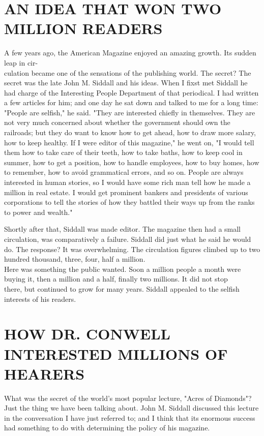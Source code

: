\documentclass[10pt]{article}
\begin{document}
\section*{AN IDEA THAT WON TWO MILLION READERS}
A few years ago, the American Magazine enjoyed an amazing growth. Its sudden leap in cir-\\
culation became one of the sensations of the publishing world. The secret? The secret was the late John M. Siddall and his ideas. When I fixst met Siddall he had charge of the Interesting People Department of that periodical. I had written a few articles for him; and one day he sat down and talked to me for a long time:\\
"People are selfish," he said. "They are interested chiefly in themselves. They are not very much concerned about whether the government should own the railroads; but they do want to know how to get ahead, how to draw more salary, how to keep healthy. If I were editor of this magazine," he went on, "I would tell them how to take care of their teeth, how to take baths, how to keep cool in summer, how to get a position, how to handle employees, how to buy homes, how to remember, how to avoid grammatical errors, and so on. People are always interested in human stories, so I would have some rich man tell how he made a million in real estate. I would get prominent bankers and presidents of various corporations to tell the stories of how they battled their ways up from the ranks to power and wealth."

Shortly after that, Siddall was made editor. The magazine then had a small circulation, was comparatively a failure. Siddall did just what he said he would do. The response? It was overwhelming. The circulation figures climbed up to two hundred thousand, three, four, half a million.\\
Here was something the public wanted. Soon a million people a month were buying it, then a million and a half, finally two millions. It did not stop\\
there, but continued to grow for many years. Siddall appealed to the selfish interests of his readers.

\section*{HOW DR. CONWELL INTERESTED MILLIONS OF HEARERS}
What was the secret of the world's most popular lecture, "Acres of Diamonds"? Just the thing we have been talking about. John M. Siddall discussed this lecture in the conversation I have just referred to; and I think that its enormous success had something to do with determining the policy of his magazine.
\end{document}
